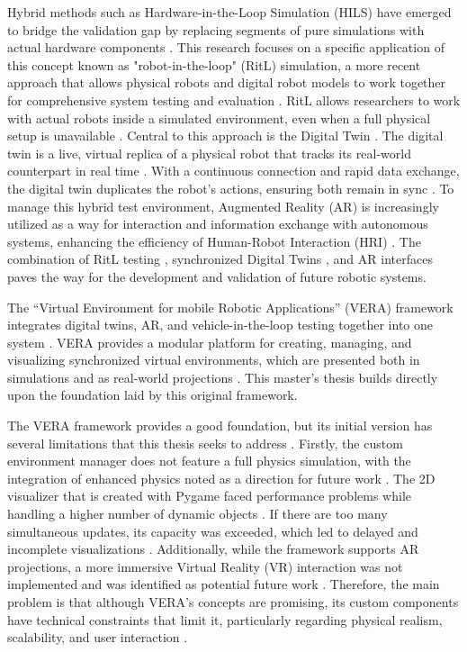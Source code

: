 Hybrid methods such as Hardware-in-the-Loop Simulation (HILS) have emerged to bridge the validation gap by replacing segments of pure simulations with actual hardware components \cite{Hu05}. This research focuses on a specific application of this concept known as "robot-in-the-loop" (RitL) simulation, a more recent approach that allows physical robots and digital robot models to work together for comprehensive system testing and evaluation \cite{Hu05}. RitL allows researchers to work with actual robots inside a simulated environment, even when a full physical setup is unavailable \cite{Hu05}. Central to this approach is the Digital Twin \cite{AA23}. The digital twin is a live, virtual replica of a physical robot that tracks its real-world counterpart in real time \cite{AA23}. With a continuous connection and rapid data exchange, the digital twin duplicates the robot’s actions, ensuring both remain in sync \cite{AA23}. To manage this hybrid test environment, Augmented Reality (AR) is increasingly utilized as a way for interaction and information exchange with autonomous systems, enhancing the efficiency of Human-Robot Interaction (HRI) \cite{MV20}. The combination of RitL testing \cite{Hu05}, synchronized Digital Twins \cite{AA23}, and AR interfaces \cite{MV20} paves the way for the development and validation of future robotic systems.

The “Virtual Environment for mobile Robotic Applications” (VERA) framework integrates digital twins, AR, and vehicle-in-the-loop testing together into one system \cite{Geh24}. VERA provides a modular platform for creating, managing, and visualizing synchronized virtual environments, which are presented both in simulations and as real-world projections \cite{Geh24}. This master's thesis builds directly upon the foundation laid by this original framework.

The VERA framework provides a good foundation, but its initial version has several limitations that this thesis seeks to address \cite{Geh24}. Firstly, the custom environment manager does not feature a full physics simulation, with the integration of enhanced physics noted as a direction for future work \cite{Geh24}. The 2D visualizer that is created with Pygame faced performance problems while handling a higher number of dynamic objects \cite{Geh24}. If there are too many simultaneous updates, its capacity was exceeded, which led to delayed and incomplete visualizations \cite{Geh24}. Additionally, while the framework supports AR projections, a more immersive Virtual Reality (VR) interaction was not implemented and was identified as potential future work \cite{Geh24}. Therefore, the main problem is that although VERA’s concepts are promising, its custom components have technical constraints that limit it, particularly regarding physical realism, scalability, and user interaction \cite{Geh24}.

